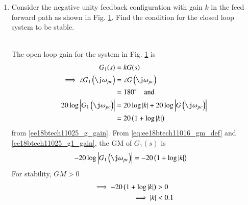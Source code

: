 \begin{enumerate}[label=\thesubsection.\arabic*.,ref=\thesubsection.\theenumi]
\item  Consider the negative unity feedback configuration with gain $k$ in the feed forward path as shown in Fig.     \ref{fig:ee18btech11025_bock}.  Find the condition for the closed loop system to be stable.
%
\begin{figure}[h]
 \centering
     \resizebox{\columnwidth}{!}{}
    \caption{}
    \label{fig:ee18btech11025_bock}
\end{figure}
\\
\solution The open loop gain for the system in    Fig.  \ref{fig:ee18btech11025_bock} is
%
    \begin{align}  
            G_1(s) &= kG(s)
\\
\implies \angle G_1\brak{\j\omega_{pc}}  &= \angle G\brak{\j\omega_{pc}}  
\\
&= 180 \degree \quad \text{and}
\\
 20\log\abs{ G_1\brak{\j\omega_{pc}}}  &= 20\log \abs{k }+20\log\abs{ G\brak{\j\omega_{pc}}}
\\
&= 20 \brak{1 + \log \abs{k }}
\label{ee18btech11025_g1_gain}
    \end{align}
from \eqref{ee18btech11025_g_gain}.  From \eqref{eq:ee18btech11016_gm_def} and \eqref{ee18btech11025_g1_gain}, the GM of $G_1(s)$ is
    \begin{align}  
-20\log \abs{ G_1\brak{\j\omega_{pc}}} &= -20 \brak{1 + \log \abs{k }}
    \end{align}
%
For stability, $GM > 0$
    \begin{align}  
\implies  -20 \left(1 + \log \left\vert k \right\vert\right) &> 0
\\
\implies  \left\vert k\right\vert &< 0.1
    \end{align}
%

\end{enumerate}
